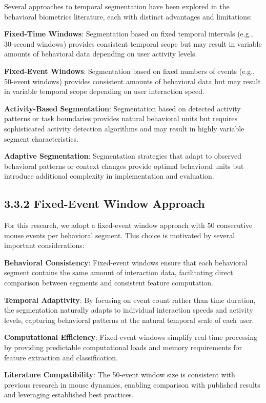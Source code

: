 \documentclass[
  12pt,
  a4paper,
]{report}
\begin{document}
Several approaches to temporal segmentation have been explored in the
behavioral biometrics literature, each with distinct advantages and
limitations:

\textbf{Fixed-Time Windows}: Segmentation based on fixed temporal
intervals (e.g., 30-second windows) provides consistent temporal scope
but may result in variable amounts of behavioral data depending on user
activity levels.

\textbf{Fixed-Event Windows}: Segmentation based on fixed numbers of
events (e.g., 50-event windows) provides consistent amounts of
behavioral data but may result in variable temporal scope depending on
user interaction speed.

\textbf{Activity-Based Segmentation}: Segmentation based on detected
activity patterns or task boundaries provides natural behavioral units
but requires sophisticated activity detection algorithms and may result
in highly variable segment characteristics.

\textbf{Adaptive Segmentation}: Segmentation strategies that adapt to
observed behavioral patterns or context changes provide optimal
behavioral units but introduce additional complexity in implementation
and evaluation.

\subsection{3.3.2 Fixed-Event Window
Approach}\label{fixed-event-window-approach}

For this research, we adopt a fixed-event window approach with 50
consecutive mouse events per behavioral segment. This choice is
motivated by several important considerations:

\textbf{Behavioral Consistency}: Fixed-event windows ensure that each
behavioral segment contains the same amount of interaction data,
facilitating direct comparison between segments and consistent feature
computation.

\textbf{Temporal Adaptivity}: By focusing on event count rather than
time duration, the segmentation naturally adapts to individual
interaction speeds and activity levels, capturing behavioral patterns at
the natural temporal scale of each user.

\textbf{Computational Efficiency}: Fixed-event windows simplify
real-time processing by providing predictable computational loads and
memory requirements for feature extraction and classification.

\textbf{Literature Compatibility}: The 50-event window size is
consistent with previous research in mouse dynamics, enabling comparison
with published results and leveraging established best practices.
\end{document}
